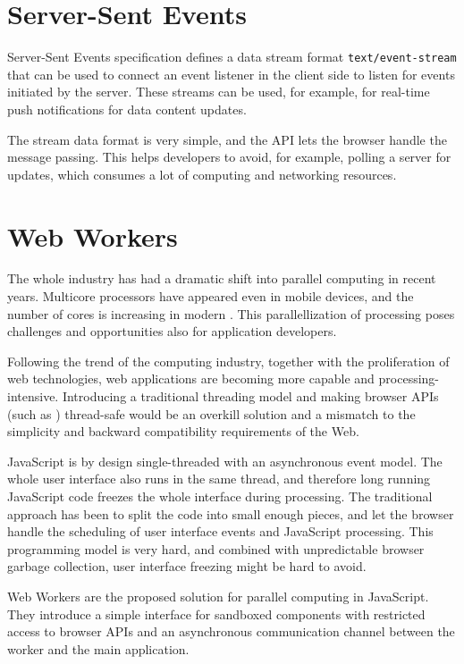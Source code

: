 \section{Server-Sent Events}

Server-Sent Events specification \cite{ServerSentEvents} defines a
data stream format \texttt{text/event-stream} that can be used to
connect an event listener in the client side to listen for events
initiated by the server. These streams can be used, for example, for
real-time push notifications for data content updates.

The stream data format is very simple, and the API lets the browser
handle the message passing. This helps developers to avoid, for
example, polling a server for updates, which consumes a lot of
computing and networking resources.

\section{Web Workers}
\label{section:webworkers}

The whole  industry has had a dramatic shift into parallel
computing in recent years. Multicore processors have appeared even in
mobile devices, and the number of cores is increasing in modern
. This parallellization of processing poses challenges and
opportunities also for application developers. \cite{asanovic2009view}

Following the trend of the computing industry, together with the
proliferation of web technologies, web applications are becoming more
capable and processing-intensive. Introducing a traditional threading
model and making browser APIs (such as ) thread-safe would
be an overkill solution and a mismatch to the simplicity and backward
compatibility requirements of the Web.

JavaScript is by design single-threaded with an asynchronous event
model. The whole user interface also runs in the same thread, and
therefore long running JavaScript code freezes the whole interface
during processing. The traditional approach has been to split the code
into small enough pieces, and let the browser handle the scheduling of
user interface events and JavaScript processing. This programming
model is very hard, and combined with unpredictable browser garbage
collection, user interface freezing might be hard to
avoid. \cite{souders2009even}

Web Workers are the proposed solution for parallel computing in
JavaScript. They introduce a simple interface for sandboxed components
with restricted access to browser APIs and an asynchronous
communication channel between the worker and the main
application. \cite{WebWorkers}

